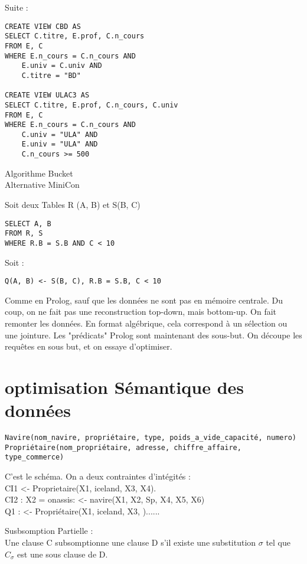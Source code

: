 {\vskip 2cm
Suite :
\begin{verbatim}
CREATE VIEW CBD AS
SELECT C.titre, E.prof, C.n_cours
FROM E, C
WHERE E.n_cours = C.n_cours AND
	E.univ = C.univ AND
	C.titre = "BD"

CREATE VIEW ULAC3 AS
SELECT C.titre, E.prof, C.n_cours, C.univ
FROM E, C
WHERE E.n_cours = C.n_cours AND
	C.univ = "ULA" AND
	E.univ = "ULA" AND
	C.n_cours >= 500

\end{verbatim}

Algorithme Bucket\\
Alternative MiniCon

Soit deux Tables R (A, B) et S(B, C)

\begin{verbatim}
SELECT A, B
FROM R, S
WHERE R.B = S.B AND C < 10
\end{verbatim}

Soit :
\begin{verbatim}
Q(A, B) <- S(B, C), R.B = S.B, C < 10
\end{verbatim}
Comme en Prolog, sauf que les données ne sont pas en mémoire centrale. Du coup, on ne fait pas une reconstruction top-down, mais bottom-up. On fait remonter les données. En format algébrique, cela correspond à un sélection ou une jointure. Les "prédicats" Prolog sont maintenant des sous-but. On découpe les requêtes en sous but, et on essaye d'optimiser.

\section{optimisation Sémantique des données}

\begin{verbatim}
Navire(nom_navire, propriétaire, type, poids_a_vide_capacité, numero)
Propriétaire(nom_propriétaire, adresse, chiffre_affaire, type_commerce)
\end{verbatim}
C'est le schéma. On a deux contraintes d'intégités :\\
CI1 <- Proprietaire(X1, iceland, X3, X4).\\
CI2 : X2 = onassis: <- navire(X1, X2, Sp, X4, X5, X6)\\

Q1 : <- Propriétaire(X1, iceland, X3, )......



\vskip 3cm
Susbsomption Partielle :\\
Une clause C subsomptionne une clause D s'il existe une substitution $\sigma$ tel que $C_\sigma$ est une sous clause de D.


}
